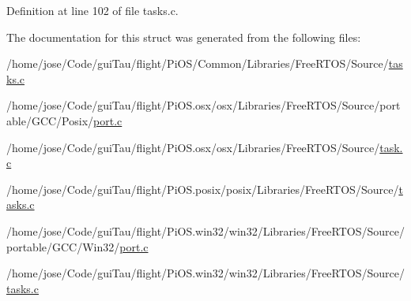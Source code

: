 Definition at line 102 of file tasks.\-c.



The documentation for this struct was generated from the following files\-:\begin{DoxyCompactItemize}
\item 
/home/jose/\-Code/gui\-Tau/flight/\-Pi\-O\-S/\-Common/\-Libraries/\-Free\-R\-T\-O\-S/\-Source/\hyperlink{_common_2_libraries_2_free_r_t_o_s_2_source_2tasks_8c}{tasks.\-c}\item 
/home/jose/\-Code/gui\-Tau/flight/\-Pi\-O\-S.\-osx/osx/\-Libraries/\-Free\-R\-T\-O\-S/\-Source/portable/\-G\-C\-C/\-Posix/\hyperlink{osx_2osx_2_libraries_2_free_r_t_o_s_2_source_2portable_2_g_c_c_2_posix_2port_8c}{port.\-c}\item 
/home/jose/\-Code/gui\-Tau/flight/\-Pi\-O\-S.\-osx/osx/\-Libraries/\-Free\-R\-T\-O\-S/\-Source/\hyperlink{task_8c}{task.\-c}\item 
/home/jose/\-Code/gui\-Tau/flight/\-Pi\-O\-S.\-posix/posix/\-Libraries/\-Free\-R\-T\-O\-S/\-Source/\hyperlink{posix_2posix_2_libraries_2_free_r_t_o_s_2_source_2tasks_8c}{tasks.\-c}\item 
/home/jose/\-Code/gui\-Tau/flight/\-Pi\-O\-S.\-win32/win32/\-Libraries/\-Free\-R\-T\-O\-S/\-Source/portable/\-G\-C\-C/\-Win32/\hyperlink{win32_2win32_2_libraries_2_free_r_t_o_s_2_source_2portable_2_g_c_c_2_win32_2port_8c}{port.\-c}\item 
/home/jose/\-Code/gui\-Tau/flight/\-Pi\-O\-S.\-win32/win32/\-Libraries/\-Free\-R\-T\-O\-S/\-Source/\hyperlink{win32_2win32_2_libraries_2_free_r_t_o_s_2_source_2tasks_8c}{tasks.\-c}\end{DoxyCompactItemize}
